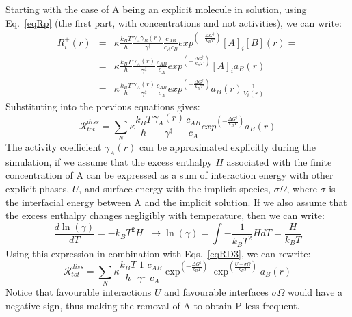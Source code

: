 \documentclass[12pt]{paper}    %
\newcommand{\RR}{\mathscr{R}}
\newcommand{\eqname}{Eq.~}
\newcommand{\eqnames}{Eqs.~}
\begin{document}
Starting with the case of A being an explicit molecule in solution, using \eqname\ref{eqRp} (the first part, with concentrations and not activities), we can write:
%
\begin{eqnarray}
R^+_i(r) & = & \kappa \frac{k_BT}{h} \frac{\gamma_A\gamma_B(r)}{\gamma^\ddag} \frac{c_{AB}}{c_Ac_B}exp^{\left( - \frac{\Delta G^\ddag}{k_BT}\right)} [A]_i[B](r) = \nonumber \\
& = & \kappa \frac{k_BT}{h} \frac{\gamma_A(r)}{\gamma^\ddag} \frac{c_{AB}}{c_A}exp^{\left( - \frac{\Delta G^\ddag}{k_BT}\right)} [A]_ia_B(r) \nonumber \\
& = & \kappa \frac{k_BT}{h} \frac{\gamma_A(r)}{\gamma^\ddag} \frac{c_{AB}}{c_A}exp^{\left( - \frac{\Delta G^\ddag}{k_BT}\right)} a_B(r)\frac{1}{V_i(r)}  \label{eqRp1}
\end{eqnarray}
%
Substituting into the previous equations gives:
%
\begin{equation}
\RR^{diss}_{tot} =  \sum_N  \kappa \frac{k_BT}{h} \frac{\gamma_A(r)}{\gamma^\ddag} \frac{c_{AB}}{c_A}exp^{\left( - \frac{\Delta G^\ddag}{k_BT}\right)} \label{eqRD3} a_B(r)
\end{equation}
%
The activity coefficient $\gamma_A(r)$ can be approximated explicitly during the simulation, if we assume that the excess enthalpy $H$ associated with the finite concentration of A can be expressed as a sum of interaction energy with other explicit phases, $U$, and surface energy with the implicit species, $\sigma \Omega$, where $\sigma$ is the interfacial energy between A and the implicit solution. If we also assume that the excess enthalpy changes negligibly with temperature, then we can write:
%
\begin{equation}
\frac{d\ln(\gamma)}{dT} = -k_BT^2 H \;\; \rightarrow \ln(\gamma) = \int -\frac{1}{k_BT^2}HdT = \frac{H}{k_BT}
\end{equation}
%
Using this expression in combination with \eqnames\ref{eqRD3}, we can rewrite:
%
\begin{equation}
\RR^{diss}_{tot} =  \sum_N  \kappa \frac{k_BT}{h} \frac{1}{\gamma^\ddag} \frac{c_{AB}}{c_A}\exp^{\left( - \frac{\Delta G^\ddag}{k_BT}\right)} \exp^{\left( \frac{U + \sigma \Omega}{k_BT}\right)} a_B(r)   \label{eqRD3}
\end{equation}
%
Notice that favourable interactions $U$ and favourable interfaces $\sigma \Omega$ would have a negative sign, thus making the removal of A to obtain P less frequent.
 
\end{document}
